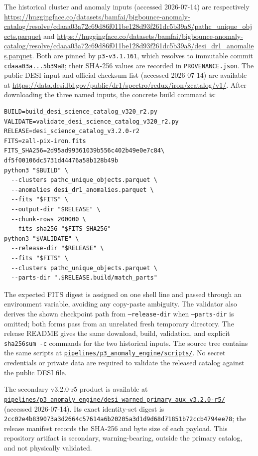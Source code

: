 \documentclass[twocolumn,linenumbers]{aastex702}
\newcommand{\warnedAuxVersion}{v3.2.0-r5}
\begin{document}
The historical cluster and anomaly inputs (accessed 2026-07-14) are respectively
\url{https://huggingface.co/datasets/bamfai/bigbounce-anomaly-catalog/resolve/cdaaa03a72c69d86f011be128d93f261dc5b39a8/pathc_unique_objects.parquet}
and
\url{https://huggingface.co/datasets/bamfai/bigbounce-anomaly-catalog/resolve/cdaaa03a72c69d86f011be128d93f261dc5b39a8/desi_dr1_anomalies.parquet}.
Both are pinned by \texttt{p3-v3.1.161}, which resolves to immutable commit
\href{https://huggingface.co/datasets/bamfai/bigbounce-anomaly-catalog/tree/cdaaa03a72c69d86f011be128d93f261dc5b39a8}{\texttt{cdaaa03a...5b39a8}}; their SHA-256 values are recorded in
\texttt{PROVENANCE.json}.  The public DESI input and official checksum list (accessed 2026-07-14) are available at
\url{https://data.desi.lbl.gov/public/dr1/spectro/redux/iron/zcatalog/v1/}.  After downloading the
three named inputs, the concrete build command is:
\begingroup
\scriptsize
\begin{verbatim}
BUILD=build_desi_science_catalog_v320_r2.py
VALIDATE=validate_desi_science_catalog_v320_r2.py
RELEASE=desi_science_catalog_v3.2.0-r2
FITS=zall-pix-iron.fits
FITS_SHA256=2d95ad99361039b556c402b49e0e7c84\
df5f00106dc5731d44476a58b128b49b
python3 "$BUILD" \
  --clusters pathc_unique_objects.parquet \
  --anomalies desi_dr1_anomalies.parquet \
  --fits "$FITS" \
  --output-dir "$RELEASE" \
  --chunk-rows 200000 \
  --fits-sha256 "$FITS_SHA256"
python3 "$VALIDATE" \
  --release-dir "$RELEASE" \
  --fits "$FITS" \
  --clusters pathc_unique_objects.parquet \
  --parts-dir ".$RELEASE.build/match_parts"
\end{verbatim}
\endgroup
The expected FITS digest is assigned on one shell line and passed through an environment
variable, avoiding any copy-paste ambiguity.  The validator also derives the shown checkpoint
path from \texttt{--release-dir} when \texttt{--parts-dir} is omitted; both forms pass from an
unrelated fresh temporary directory.  The release README gives the same download, build,
validation, and explicit \texttt{sha256sum -c} commands for the two historical inputs.  The source tree contains the same
scripts at \href{https://github.com/Hubify-Projects/bigbounce/tree/main/pipelines/p3_anomaly_engine/scripts}{\nolinkurl{pipelines/p3_anomaly_engine/scripts/}}.  No secret credentials or private
data are required to validate the released catalog against the public DESI file.

The secondary \warnedAuxVersion{} product is available at
\href{https://github.com/Hubify-Projects/bigbounce/tree/main/pipelines/p3_anomaly_engine/desi_warned_primary_aux_v3.2.0-r5}{\nolinkurl{pipelines/p3_anomaly_engine/desi_warned_primary_aux_v3.2.0-r5/}}
(accessed 2026-07-14).  Its exact identity-set digest is
\texttt{2cc02e4b839073a3d2664c57614a6b20\allowbreak205a3d1d9d68d71851b72ccb4794ee78};
the release manifest records the SHA-256 and byte size of each payload.  This repository artifact
is secondary, warning-bearing, outside the primary catalog, and not physically validated.
\end{document}
